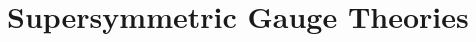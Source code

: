 \documentclass[11pt,a4paper]{article}
\makeatletter
\numberwithin{equation}{subsection}
\newcommand{\checklabel}[2]{%
  \begingroup
  \def\@currentlabel{#2}%
  \label{#1}%
  \endgroup
}
\makeatother
\begin{document}
\setcounter{section}{26}
\section{Supersymmetric Gauge Theories}
\setcounter{subsection}{2}

\checklabel{eq:23.5.4}{23.5.4}
\checklabel{eq:23.5.19}{23.5.19}
\checklabel{eq:23.5.20}{23.5.20}
\checklabel{eq:26.2.15}{26.2.15}
\checklabel{eq:26.2.16}{26.2.16}
\checklabel{eq:26.2.17}{26.2.17}
\checklabel{eq:26.A.7}{26.A.7}
\checklabel{eq:27.1.12}{27.1.12}
\checklabel{eq:27.2.6}{27.2.6}


\end{document}
